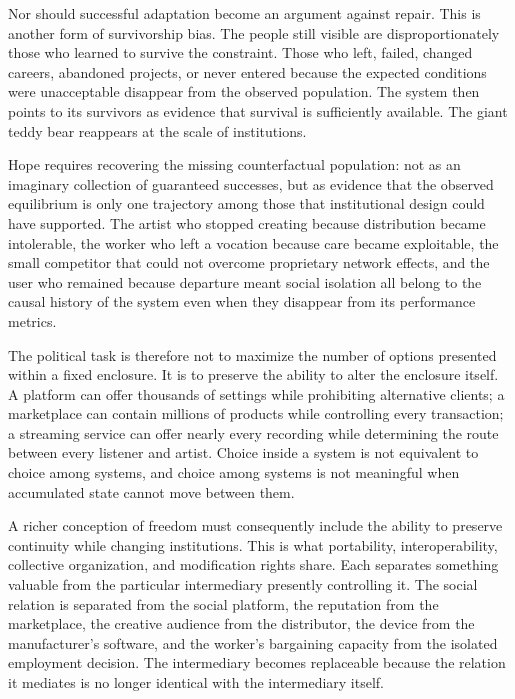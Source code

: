 \documentclass[11pt]{article}
\begin{document}
Nor should successful adaptation become an argument against repair. This is another form of survivorship bias. The people still visible are disproportionately those who learned to survive the constraint. Those who left, failed, changed careers, abandoned projects, or never entered because the expected conditions were unacceptable disappear from the observed population. The system then points to its survivors as evidence that survival is sufficiently available. The giant teddy bear reappears at the scale of institutions.

Hope requires recovering the missing counterfactual population: not as an imaginary collection of guaranteed successes, but as evidence that the observed equilibrium is only one trajectory among those that institutional design could have supported. The artist who stopped creating because distribution became intolerable, the worker who left a vocation because care became exploitable, the small competitor that could not overcome proprietary network effects, and the user who remained because departure meant social isolation all belong to the causal history of the system even when they disappear from its performance metrics.

The political task is therefore not to maximize the number of options presented within a fixed enclosure. It is to preserve the ability to alter the enclosure itself. A platform can offer thousands of settings while prohibiting alternative clients; a marketplace can contain millions of products while controlling every transaction; a streaming service can offer nearly every recording while determining the route between every listener and artist. Choice inside a system is not equivalent to choice among systems, and choice among systems is not meaningful when accumulated state cannot move between them.

A richer conception of freedom must consequently include the ability to preserve continuity while changing institutions. This is what portability, interoperability, collective organization, and modification rights share. Each separates something valuable from the particular intermediary presently controlling it. The social relation is separated from the social platform, the reputation from the marketplace, the creative audience from the distributor, the device from the manufacturer's software, and the worker's bargaining capacity from the isolated employment decision. The intermediary becomes replaceable because the relation it mediates is no longer identical with the intermediary itself.
\end{document}
